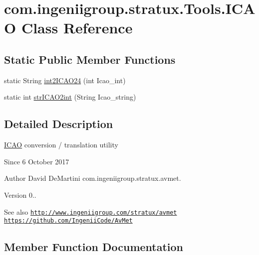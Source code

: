 \hypertarget{classcom_1_1ingeniigroup_1_1stratux_1_1_tools_1_1_i_c_a_o}{}\section{com.\+ingeniigroup.\+stratux.\+Tools.\+I\+C\+AO Class Reference}
\label{classcom_1_1ingeniigroup_1_1stratux_1_1_tools_1_1_i_c_a_o}
\subsection*{Static Public Member Functions}
\begin{DoxyCompactItemize}
\item 
static String \hyperlink{classcom_1_1ingeniigroup_1_1stratux_1_1_tools_1_1_i_c_a_o_abe474b07079bb1183b58b5941c4f340a}{int2\+I\+C\+A\+O24} (int Icao\+\_\+int)
\item 
static int \hyperlink{classcom_1_1ingeniigroup_1_1stratux_1_1_tools_1_1_i_c_a_o_a261620737e5ad943494d3d108474e48a}{str\+I\+C\+A\+O2int} (String Icao\+\_\+string)
\end{DoxyCompactItemize}


\subsection{Detailed Description}
\hyperlink{classcom_1_1ingeniigroup_1_1stratux_1_1_tools_1_1_i_c_a_o}{I\+C\+AO} conversion / translation utility

\begin{DoxySince}{Since}
6 October 2017 
\end{DoxySince}
\begin{DoxyAuthor}{Author}
David De\+Martini  com.\+ingeniigroup.\+stratux.\+avmet. 
\end{DoxyAuthor}
\begin{DoxyVersion}{Version}
0.. 
\end{DoxyVersion}
\begin{DoxySeeAlso}{See also}
\href{http://www.ingeniigroup.com/stratux/avmet}{\tt http\+://www.\+ingeniigroup.\+com/stratux/avmet}  \href{https://github.com/IngeniiCode/AvMet}{\tt https\+://github.\+com/\+Ingenii\+Code/\+Av\+Met} 
\end{DoxySeeAlso}


\subsection{Member Function Documentation}
\mbox{\label{classcom_1_1ingeniigroup_1_1stratux_1_1_tools_1_1_i_c_a_o_abe474b07079bb1183b58b5941c4f340a}} 
